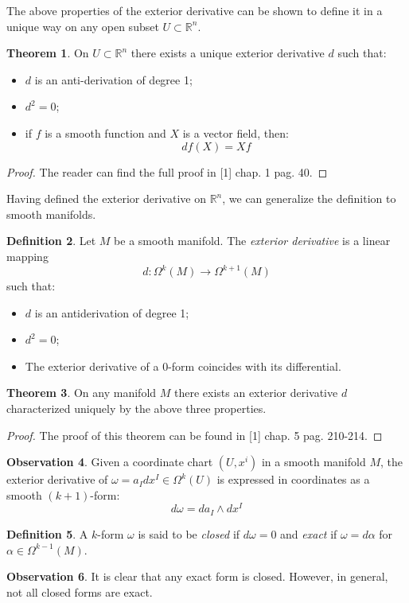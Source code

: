 \documentclass[12pt,a4paper]{report}
\theoremstyle{definition}
\newtheorem{Def}{Definition}[chapter]
\theoremstyle{Theorem}
\newtheorem{Theo}[Def]{Theorem}
\theoremstyle{definition}
\theoremstyle{definition}
\newtheorem{Obs}[Def]{Observation}
\begin{document}
	The above properties of the exterior derivative can be shown to define it in a unique way on any open subset $U\subset\mathbb{R}^n$.
	\begin{Theo}
		On $U\subset\mathbb{R}^n$ there exists a unique exterior derivative $d$ such that:
		\begin{itemize}
			\item $d$ is an anti-derivation of degree 1;
			\item $d^2=0$;
			\item if $f$ is a smooth function and $X$ is a vector field, then:
			$$df(X)=Xf$$
		\end{itemize}
	\end{Theo}
	\begin{proof}
		The reader can find the full proof in [1] chap. 1 pag. 40.
	\end{proof}
	Having defined the exterior derivative on $\mathbb{R}^n$, we can generalize the definition to smooth manifolds.
	\begin{Def}
		Let $M$ be a smooth manifold. The \textit{exterior derivative} is a linear mapping 
		$$d:\Omega^k(M)\rightarrow\Omega^{k+1}(M)$$
		such that:
		\begin{itemize}
			\item $d$ is an antiderivation of degree 1;
			\item $d^2=0$;
			\item The exterior derivative of a 0-form coincides with its differential.
		\end{itemize}
	\end{Def}
	\begin{Theo}
		On any manifold $M$ there exists an exterior derivative $d$ characterized uniquely by the above three properties.
	\end{Theo}
	\begin{proof}
		The proof of this theorem can be found in [1] chap. 5 pag. 210-214.
	\end{proof}
	\begin{Obs}
		Given a coordinate chart $(U,x^i)$ in a smooth manifold $M$, the exterior derivative of $\omega=a_Idx^I\in \Omega^k(U)$ is expressed in coordinates as a smooth $(k+1)$-form:
		$$d\omega=da_I\wedge dx^I$$
	\end{Obs}
	\begin{Def}
		A $k$-form $\omega$ is said to be \textit{closed} if $d\omega=0$ and \textit{exact} if $\omega=d\alpha$ for $\alpha\in\Omega^{k-1}(M)$.
	\end{Def}
	\begin{Obs}
		It is clear that any exact form is closed. However, in general, not all closed forms are exact.
	\end{Obs}
\end{document}
